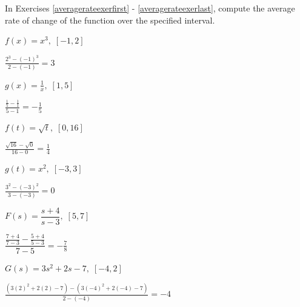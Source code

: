 \documentclass{ximera}
\begin{document}
\begin{question}
In Exercises \ref{averagerateexerfirst} - \ref{averagerateexerlast}, compute the average rate of change of the  function over the specified interval.

\begin{problem}\label{averagerateexerfirst}
$f(x) = x^{3}, \; [-1, 2]$

\begin{solution}
$\frac{2^{3} - (-1)^{3}}{2 - (-1)} = 3$
\end{solution}
\end{problem}

\begin{problem}
$g(x) = \frac{1}{x}, \; [1, 5]$

\begin{solution}
$\frac{\frac{1}{5} - \frac{1}{1}}{5 - 1} = -\frac{1}{5}$
\end{solution}
\end{problem}

\begin{problem}
$f(t) = \sqrt{t}, \; [0, 16]$

\begin{solution}
$\frac{\sqrt{16} - \sqrt{0}}{16 - 0} = \frac{1}{4}$
\end{solution}
\end{problem}

\begin{problem}
$g(t) = x^{2}, \; [-3, 3]$

\begin{solution}
$\frac{3^{2} - (-3)^{2}}{3 - (-3)} = 0$
\end{solution}
\end{problem}

\begin{problem}
$F(s) = \dfrac{s + 4}{s - 3}, \; [5, 7]$

\begin{solution}
$\dfrac{\frac{7 + 4}{7 - 3} - \frac{5 + 4}{5 - 3}}{7 - 5} = -\frac{7}{8}$
\end{solution}
\end{problem}

\begin{problem}\label{averagerateexerlast}
$G(s) = 3s^{2} + 2s - 7, \; [-4, 2]$

\begin{solution}
$\frac{(3(2)^{2}+2(2)-7)-(3(-4)^{2}+2(-4)-7)}{2-(-4)}=-4$
\end{solution}
\end{problem}
\end{question}
\end{document}
